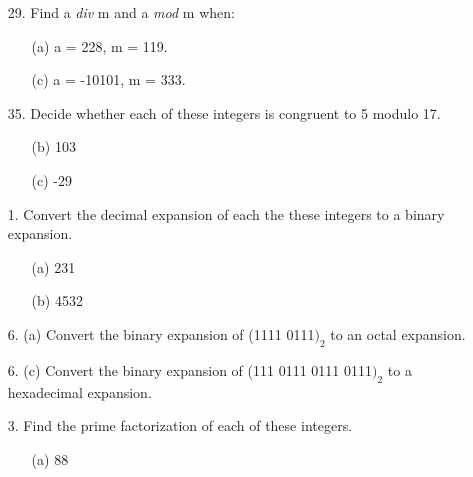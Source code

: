 \documentclass[12pt]{article}
\newcommand\bufsub{\vspace{1.0in}}
\begin{document}
\begin{enumerate}

\item[29.] Find a \emph{div} m and a \emph{mod} m when:

\begin{enumerate}
    \item[(a)] a = 228, m = 119.
    
    
    \item[(c)] a = -10101, m = 333.
    
    
\end{enumerate}
\bufsub


\item[35.] Decide whether each of these integers is congruent to 5 modulo 17.

\begin{enumerate}
    \item[(b)] 103
    
    
    \item[(c)] -29
    
    
\end{enumerate}
\newpage


\item[1.] Convert the decimal expansion of each the these integers to a binary expansion.

\begin{enumerate}
    \item[(a)] 231
    
    
    \item[(b)] 4532
    
    
\end{enumerate}
\bufsub


\item[6. (a)] Convert the binary expansion of (1111 0111$)_{2}$ to an octal expansion.
\bufsub


\item[6. (c)] Convert the binary expansion of (111 0111 0111 0111$)_2$ to a hexadecimal expansion.                               
\bufsub


\item[3.] Find the prime factorization of each of these integers.

\begin{enumerate}
    \item[(a)] 88
    

\end{enumerate}
\end{enumerate}
\end{document}
